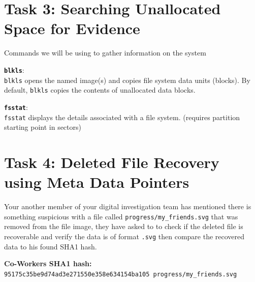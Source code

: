 \documentclass[a4paper,11pt]{article}
\begin{document}
\section{Task 3: Searching Unallocated Space for Evidence}
Commands we will be using to gather information on the system
\begin{itemize*}
	\item \textbf{\texttt{blkls}}:\\ \texttt{blkls} opens the named image(s) and copies file system data  units  (blocks).   By default,  \texttt{blkls} copies the contents of unallocated data blocks. 
	\item \textbf{\texttt{fsstat}}:\\ \texttt{fsstat} displays the details associated with a file system. (requires partition starting point in sectors)
\end{itemize*}

\section{Task 4: Deleted File Recovery using Meta Data Pointers}
Your another member of your digital investigation team has mentioned there is something suspicious with a file called \texttt{progress/my\_friends.svg} that was removed from the file image, they have asked to to check if the deleted file is recoverable and verify the data is of format \texttt{.svg} then compare the recovered data to his found SHA1 hash.

{\noindent
\textbf{Co-Workers SHA1 hash:}\\
\texttt{95175c35be9d74ad3e271550e358e634154ba105  progress/my\_friends.svg}
}
\end{document}

